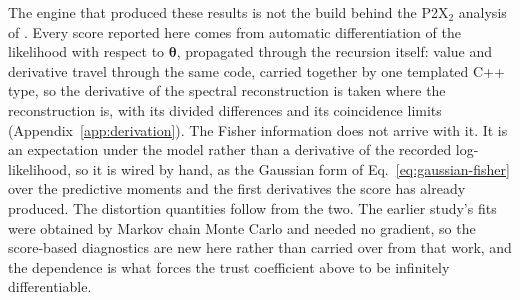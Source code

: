 The engine that produced these results is not the build behind the P2X$_2$ analysis of
\citet{moffatt2025bayesian}. Every score reported here comes from automatic
differentiation of the likelihood with respect to $\boldsymbol{\theta}$, propagated through the
recursion itself: value and derivative travel through the same code, carried together by
one templated C++ type, so the derivative of the spectral reconstruction is taken where
the reconstruction is, with its divided differences and its coincidence limits
(Appendix~\ref{app:derivation}). The Fisher information does not arrive with it. It is an
expectation under the model rather than a derivative of the recorded log-likelihood, so it
is wired by hand, as the Gaussian form of Eq.~\ref{eq:gaussian-fisher} over the predictive
moments and the first derivatives the score has already produced. The distortion quantities
follow from the two. The earlier study's fits were obtained by Markov chain Monte Carlo and
needed no gradient, so the score-based diagnostics are new here rather than carried over from
that work, and the dependence is what forces the trust coefficient above to be infinitely
differentiable.
